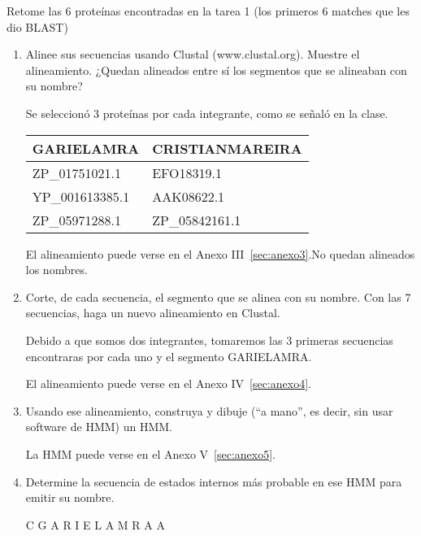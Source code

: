 Retome las 6 proteínas encontradas en la tarea 1 (los primeros 6 matches que les dio BLAST)

\begin{enumerate}
	\item Alinee sus secuencias usando Clustal (www.clustal.org). Muestre el alineamiento. ¿Quedan
		alineados entre sí los segmentos que se alineaban con su nombre?
	

		Se seleccionó 3 proteínas por cada integrante, como se señaló en la clase.\\

		\begin{center}
		\begin{tabular}{|l|l|}
			\hline
			GARIELAMRA & CRISTIANMAREIRA \\
			\hline
			ZP\_01751021.1 & EFO18319.1 \\ 
			YP\_001613385.1 & AAK08622.1 \\
			ZP\_05971288.1 & ZP\_05842161.1 \\
			\hline
		\end{tabular}
		\end{center}

	El alineamiento puede verse en el Anexo III~\ref{sec:anexo3}.No quedan alineados los nombres.
			

	\item Corte, de cada secuencia, el segmento que se alinea con su nombre. Con las 7 secuencias,
		haga un nuevo alineamiento en Clustal.


		Debido a que somos dos integrantes,
		tomaremos las 3 primeras secuencias encontraras por cada uno y el
		segmento GARIELAMRA.

		 El alineamiento puede verse en el Anexo IV~\ref{sec:anexo4}.

	\item Usando ese alineamiento, construya y dibuje (“a mano”, es decir, sin usar software de HMM)
		un HMM.


		 La HMM puede verse en el Anexo V~\ref{sec:anexo5}.

	\item Determine la secuencia de estados internos más probable en ese HMM para emitir su
		nombre.


		\begin{center}
		C G A R I E L A M R A A
		\end{center}

\end{enumerate}
